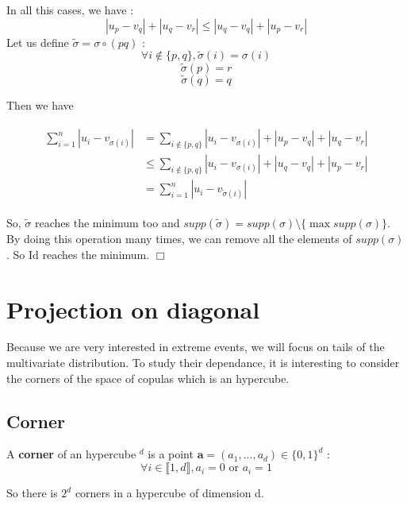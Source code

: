 \documentclass{article}
\begin{document}
In all this cases, we have :
\begin{equation*}
	|u_p-v_q| + |u_q-v_r| \leq |u_q-v_q|+|u_p-v_r|
\end{equation*}
Let us define $\tilde{\sigma} = \sigma \circ (p q)$ :\newline
\begin{equation*}
 	\forall i \notin \{p,q\}, \tilde{\sigma} (i)=\sigma (i)
\end{equation*}
\begin{equation*}
 	\tilde{\sigma} (p)=r
\end{equation*}
\begin{equation*}
 	\tilde{\sigma} (q)=q
\end{equation*}

Then  we have

\begin{multline*}
	\begin{split}
	\sum_{i=1}^n |u_i-v_{\sigma (i)}|	&= \sum_{i\notin \{p,q\}} |u_i-v_{\sigma (i)}|+|u_p-v_q|+|u_q-v_r|\\
	 	&\leq \sum_{i\notin \{p,q\}} |u_i-v_{\sigma (i)}|+|u_q-v_q|+|u_p-v_r|\\
	 	&=\sum_{i=1}^n |u_i-v_{\tilde{\sigma} (i)}|
	\end{split}
	\end{multline*}

So, $\tilde{\sigma}$ reaches the minimum too and $supp(\tilde{\sigma}) = supp(\sigma) \setminus \{\max supp(\sigma) \}$. By doing this operation many times, we can remove all the elements of $supp(\sigma)$. So Id reaches the minimum. $\Box$

   
   \section{Projection on diagonal}
   Because we are very interested in extreme events, we will focus on tails of the multivariate distribution. To study their dependance, it is interesting to consider the corners of the space of copulas which is an hypercube.
   \subsection{Corner}
  
	\begin{definition}
		A \textbf{corner} of an hypercube \begin{math} [0,1]^d \end{math} is a point \begin{math} \textbf{a}=(a_1,...,a_d) \in \{0,1\}^d \end{math} : \begin{equation*}
		\forall i \in  \llbracket 1,d \rrbracket, a_{i} = 0 \text{ or } a_{i}=1 
		\end{equation*}
	\end{definition}
	So there is \begin{math} 2^d\end{math} corners in a hypercube of dimension d.\newline
	
\end{document}

